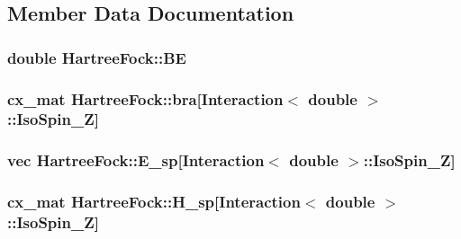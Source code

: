 \subsection{Member Data Documentation}
\hypertarget{class_hartree_fock_ae654600f841836c3cb98abee72bf6c35}{
\subsubsection[{B\-E}]{\setlength{\rightskip}{0pt plus 5cm}double Hartree\-Fock\-::\-B\-E\hspace{0.3cm}{\ttfamily [private]}}}\label{class_hartree_fock_ae654600f841836c3cb98abee72bf6c35}
\hypertarget{class_hartree_fock_a7e7361a6e064c9983b0e263f250dd615}{
\subsubsection[{bra}]{\setlength{\rightskip}{0pt plus 5cm}cx\-\_\-mat Hartree\-Fock\-::bra\mbox{[}{\bf Interaction}$<$ double $>$\-::Iso\-Spin\-\_\-\-Z\mbox{]}\hspace{0.3cm}{\ttfamily [private]}}}\label{class_hartree_fock_a7e7361a6e064c9983b0e263f250dd615}
\hypertarget{class_hartree_fock_a1bb866f2ea89dc0d44f70e1d8e6b1425}{
\subsubsection[{E\-\_\-sp}]{\setlength{\rightskip}{0pt plus 5cm}vec Hartree\-Fock\-::\-E\-\_\-sp\mbox{[}{\bf Interaction}$<$ double $>$\-::Iso\-Spin\-\_\-\-Z\mbox{]}\hspace{0.3cm}{\ttfamily [private]}}}\label{class_hartree_fock_a1bb866f2ea89dc0d44f70e1d8e6b1425}
\hypertarget{class_hartree_fock_a4cd7c0aece3eec0c593638763f846d36}{
\subsubsection[{H\-\_\-sp}]{\setlength{\rightskip}{0pt plus 5cm}cx\-\_\-mat Hartree\-Fock\-::\-H\-\_\-sp\mbox{[}{\bf Interaction}$<$ double $>$\-::Iso\-Spin\-\_\-\-Z\mbox{]}\hspace{0.3cm}{\ttfamily [private]}}}\label{class_hartree_fock_a4cd7c0aece3eec0c593638763f846d36}
